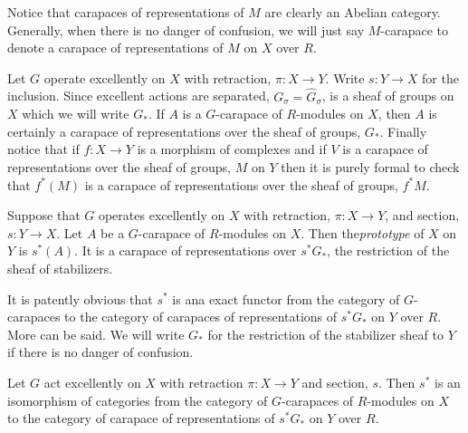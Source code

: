 Notice that carapaces of representations of $M$ are clearly an Abelian category. Generally, when there is no danger of confusion, we will just say $M$-carapace to denote a carapace of representations of $M$ on $X$ over $R$.

Let $G$ operate excellently on $X$ with retraction, $\pi : X\rightarrow Y$. Write $s : Y \rightarrow X$ for the inclusion. Since excellent actions are separated, $G_{\sigma} = \hat{G}_{\sigma}$, is a sheaf of groups on $X$ which we will write $G_{*}$. If $A$ is a $G$-carapace of $R$-modules on $X$, then $A$ is certainly a carapace of representations over the sheaf of groups, $G_{*}$. Finally notice that if $f : X\rightarrow Y$ is a morphism of complexes and if $V$ is a carapace of representations over the sheaf of groups, $M$ on $Y$ then it is purely formal to check that $f^{*}(M)$ is a carapace of representations over the sheaf of groups, $f^{*}M$.

\begin{definition}\label{art6-definition-9.11}
Suppose that $G$ operates excellently on $X$ with retraction, $\pi : X\rightarrow Y$, and section, $s: Y \rightarrow X$. Let $A$ be a $G$-carapace of $R$-modules on $X$. Then the\textit{prototype} of $X$ on $Y$ is $s^{*}(A)$. It is a carapace of representations over $s^{*}G_{*}$, the restriction of the sheaf of stabilizers.
\end{definition}

It is patently obvious that $s^{*}$ is ana exact functor from the category of $G$-carapaces to the category of carapaces of representations of $s^{*}G_{*}$ on $Y$ over $R$. More can be said. We will write $G_{*}$ for the restriction of the stabilizer sheaf to $Y$ if there is no danger of confusion.

\begin{theorem}\label{art6-thm-9.12}
Let $G$ act excellently on $X$ with retraction $\pi : X\rightarrow Y$ and section, $s$. Then $s^{*}$ is an isomorphism of categories from the category of $G$-carapaces of $R$-modules on $X$ to the category of carapace of representations of $s^{*}G_{*}$ on $Y$ over $R$.
\end{theorem}

